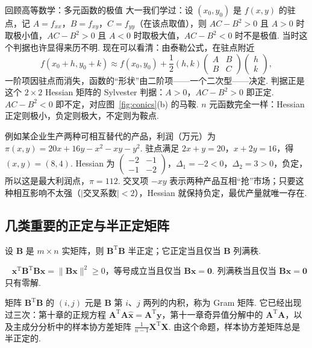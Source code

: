 \documentclass[lang=cn,10.5pt,scheme=chinese,toc=twocol,section,chinesefont=nofont,
twoside,citestyle=gb7714-2015,bibstyle=gb7714-2015]{elegantbook}
\DeclareRobustCommand{\textbf}[1]{{\lnsemiboldlatin\lnsemiboldcjk #1}}
\newcommand{\vv}[1]{\boldsymbol{#1}}
\newcommand{\zero}{\boldsymbol{0}}          %
\newcommand{\trans}{\mathrm{T}}             %
\numberwithin{equation}{section}   %
\newcommand{\hB}{\texorpdfstring{\textdagger}{†}}
\newcommand*{\lnlabel}[1]{{\sffamily\bfseries\color{black}#1}}
\renewenvironment{proof}{%
	\par\noindent\lnlabel{\proofname}\;\ \color{black!90}\cfs}{\par}
\begin{document}
\begin{linkbox}{回顾高等数学：多元函数的极值}
  大一我们学过：设 $(x_0,y_0)$ 是 $f(x,y)$ 的驻点，记 $A=f_{xx}$，$B=f_{xy}$，$C=f_{yy}$（在该点取值），则 $AC-B^2>0$ 且 $A>0$ 时取极小值，$AC-B^2>0$ 且 $A<0$ 时取极大值，$AC-B^2<0$ 时不是极值. 当时这个判据也许显得来历不明. 现在可以看清：由泰勒公式，在驻点附近
  \[
    f(x_0+h,y_0+k)\approx f(x_0,y_0)+\frac12(h,k)
    \begin{pmatrix}
      A & B \\B&C
    \end{pmatrix}
    \begin{pmatrix}
      h \\k
    \end{pmatrix}
    ,
  \]
  一阶项因驻点而消失，函数的“形状”由二阶项——一个二次型——决定. 判据正是这个 $2\times2$ \textbf{Hessian 矩阵}的 Sylvester 判据：$A>0$，$AC-B^2>0$ 即正定. $AC-B^2<0$ 即不定，对应图~\ref{fig:conics}(b) 的马鞍. $n$ 元函数完全一样：Hessian 正定则极小，负定则极大，不定则为鞍点.

  例如某企业生产两种可相互替代的产品，利润（万元）为 $\pi(x,y)=20x+16y-x^2-xy-y^2$. 驻点满足 $2x+y=20$，$x+2y=16$，得 $(x,y)=(8,4)$. Hessian 为 $
    \begin{pmatrix}
      -2 & -1 \\-1&-2
    \end{pmatrix}
  $，$\Delta_1=-2<0$，$\Delta_2=3>0$，负定，所以这是最大利润点，$\pi=112$. 交叉项 $-xy$ 表示两种产品互相“抢”市场；只要这种相互影响不太强（$|$交叉系数$|<2$），Hessian 就保持负定，最优产量就唯一存在.
\end{linkbox}

\subsection{\hB 几类重要的正定与半正定矩阵}

\begin{proposition}
  \label{prop:gram}
  设 $\vv B$ 是 $m\times n$ 实矩阵，则 $\vv B^\trans\vv B$ 半正定；它正定当且仅当 $\vv B$ 列满秩.
\end{proposition}
\begin{proof}
  $\vv x^\trans\vv B^\trans\vv B\vv x=\|\vv B\vv x\|^2\ge0$，等号成立当且仅当 $\vv B\vv x=\zero$. 列满秩当且仅当 $\vv B\vv x=\zero$ 只有零解.
\end{proof}

矩阵 $\vv B^\trans\vv B$ 的 $(i,j)$ 元是 $\vv B$ 第 $i$、$j$ 两列的内积，称为 \textbf{Gram 矩阵}. 它已经出现过三次：第十章的正规方程 $\vv A^\trans\vv A\hat{\vv x}=\vv A^\trans\vv y$，第十一章奇异值分解中的 $\vv A^\trans\vv A$，以及主成分分析中的样本协方差矩阵 $\frac1{n-1}\vv X^\trans\vv X$. 由这个命题，\textbf{样本协方差矩阵总是半正定的}.
\end{document}
